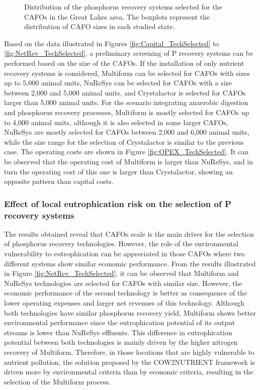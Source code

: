 \begin{refsection}[referencesCh4]
\begin{figure}[h]
	\caption{Distribution of the phosphorus recovery systems selected for the CAFOs in the Great Lakes area. The boxplots represent the distribution of CAFO sizes in each studied state.}
	\label{fig:PTechs_Distribution}
\end{figure}

Based on the data illustrated in Figures \ref{fig:Capital_TechSelected} to \ref{fig:NetRev_TechSelected}, a preliminary screening of P recovery systems can be performed based on the size of the CAFOs. If the installation of only nutrient recovery systems is considered, Multiform can be selected for CAFOs with sizes up to 5,000 animal units, NuReSys can be selected for CAFOs with a size between 2,000 and 5,000 animal units, and Crystalactor is selected for CAFOs larger than 5,000 animal units. For the scenario integrating anaerobic digestion and phosphorus recovery processes, Multiform is mostly selected for CAFOs up to 4,000 animal units, although it is also selected in some larger CAFOs, NuReSys are mostly selected for CAFOs between 2,000 and 6,000 animal units, while the size range for the selection of Crystalactor is similar to the previous case. The operating costs are shown in Figure \ref{fig:OPEX_TechSelected}. It can be observed that the operating cost of Multiform is larger than NuReSys, and in turn the operating cost of this one is larger than Crystalactor, showing an opposite pattern than capital costs.

\subsubsection{Effect of local eutrophication risk on the selection of P recovery systems}
The results obtained reveal that CAFOs scale is the main driver for the selection of phosphorus recovery technologies. However, the role of the environmental vulnerability to eutrophication can be appreciated in those CAFOs where two different systems show similar economic performance. From the results illustrated in Figure \ref{fig:NetRev_TechSelected}, it can be observed that Multiform and NuReSys technologies are selected for CAFOs with similar size. However, the economic performance of the second technology is better as consequence of the lower operating expenses and larger net revenues of this technology. Although both technologies have similar phosphorus recovery yield, Multiform shows better environmental performance since the eutrophication potential of its output streams is lower than NuReSys effluents. This difference in eutrophication potential between both technologies is mainly driven by the higher nitrogen recovery of Multiform. Therefore, in those locations that are highly vulnerable to nutrient pollution, the solution proposed by the COW2NUTRIENT framework is driven more by environmental criteria than by economic criteria, resulting in the selection of the Multiform process.


\end{refsection}
